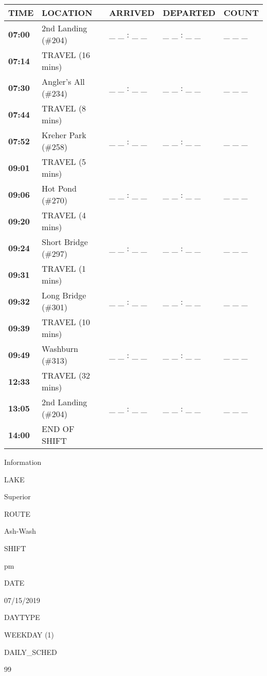 \documentclass[]{article}
\begin{document}
\begin{tabular}{>{\bfseries}lllll}
\toprule
\textbf{TIME} & \textbf{LOCATION} & \textbf{ARRIVED} & \textbf{DEPARTED} & \textbf{COUNT}\\
\midrule
07:00 & 2nd Landing (\#204) & \_ \_ : \_ \_ & \_ \_ : \_ \_ & \_ \_ \_\\
07:14 & TRAVEL (16 mins) &  &  & \\
07:30 & Angler's All (\#234) & \_ \_ : \_ \_ & \_ \_ : \_ \_ & \_ \_ \_\\
07:44 & TRAVEL (8 mins) &  &  & \\
07:52 & Kreher Park (\#258) & \_ \_ : \_ \_ & \_ \_ : \_ \_ & \_ \_ \_\\
09:01 & TRAVEL (5 mins) &  &  & \\
09:06 & Hot Pond (\#270) & \_ \_ : \_ \_ & \_ \_ : \_ \_ & \_ \_ \_\\
09:20 & TRAVEL (4 mins) &  &  & \\
09:24 & Short Bridge (\#297) & \_ \_ : \_ \_ & \_ \_ : \_ \_ & \_ \_ \_\\
09:31 & TRAVEL (1 mins) &  &  & \\
09:32 & Long Bridge (\#301) & \_ \_ : \_ \_ & \_ \_ : \_ \_ & \_ \_ \_\\
09:39 & TRAVEL (10 mins) &  &  & \\
09:49 & Washburn (\#313) & \_ \_ : \_ \_ & \_ \_ : \_ \_ & \_ \_ \_\\
12:33 & TRAVEL (32 mins) &  &  & \\
13:05 & 2nd Landing (\#204) & \_ \_ : \_ \_ & \_ \_ : \_ \_ & \_ \_ \_\\
14:00 & END OF SHIFT &  &  & \\
\bottomrule
\end{tabular}\newpage

Information

LAKE

Superior

ROUTE

Ash-Wash

SHIFT

pm

DATE

07/15/2019

DAYTYPE

WEEKDAY (1)

DAILY\_SCHED

99

\vspace{24pt}
\end{document}
